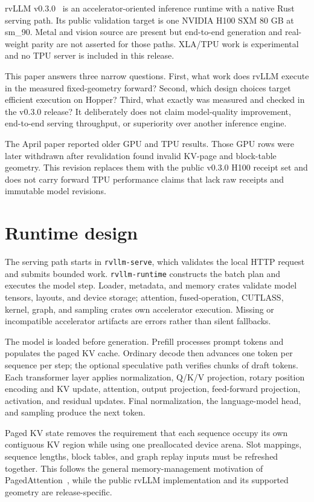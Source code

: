 rvLLM v0.3.0~\citep{rvllm2026release} is an accelerator-oriented inference
runtime with a native Rust serving path. Its public validation target is one
NVIDIA H100 SXM 80 GB at
sm\_90. Metal and vision source are present but end-to-end generation and
real-weight parity are not asserted for those paths. XLA/TPU work is
experimental and no TPU server is included in this release.

This paper answers three narrow questions. First, what work does rvLLM execute
in the measured fixed-geometry forward? Second, which design choices target
efficient execution on Hopper? Third, what exactly was measured and checked in the
v0.3.0 release? It deliberately does not claim model-quality improvement,
end-to-end serving throughput, or superiority over another inference engine.

The April paper reported older GPU and TPU results. Those GPU rows were later
withdrawn after revalidation found invalid KV-page and block-table geometry.
This revision replaces them with the public v0.3.0 H100 receipt set and does
not carry forward TPU performance claims that lack raw receipts and immutable
model revisions.

\section{Runtime design}

The serving path starts in \texttt{rvllm-serve}, which validates the local HTTP
request and submits bounded work. \texttt{rvllm-runtime} constructs the batch
plan and executes the model step. Loader, metadata, and memory crates validate
model tensors, layouts, and device storage; attention, fused-operation,
CUTLASS, kernel, graph, and sampling crates own accelerator execution. Missing
or incompatible accelerator artifacts are errors rather than silent
fallbacks.

The model is loaded before generation. Prefill processes prompt tokens and
populates the paged KV cache. Ordinary decode then advances one token per
sequence per step; the optional speculative path verifies chunks of draft
tokens. Each transformer layer applies normalization, Q/K/V projection,
rotary position encoding and KV update, attention, output projection,
feed-forward projection, activation, and residual updates. Final
normalization, the language-model head, and sampling produce the next token.

Paged KV state removes the requirement that each sequence occupy its own
contiguous KV region while using one preallocated device arena. Slot mappings,
sequence lengths, block tables, and graph replay inputs must be refreshed
together. This follows the general memory-management motivation of
PagedAttention~\citep{kwon2023pagedattention}, while the public rvLLM
implementation and its supported geometry are release-specific.

